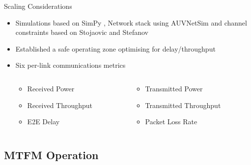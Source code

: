 \documentclass{beamer}
\begin{document}
\begin{frame}[label=scaling]{Scaling Considerations}
  \begin{itemize}
    \item Simulations based on SimPy \autocite{Mueller2003SimPy}, Network stack using AUVNetSim \autocite{Miquel2008} and channel constraints based on Stojaovic and Stefanov \autocite{Stojanovic2007,Stefanov2011}\hyperlink{tab:sysconstraints}{}
      \pause
    \item Established a safe operating zone optimising for delay/throughput  \hyperlink{eq:networkeffects}{}
    \item Six per-link communications metrics
      \pause\begin{columns}
        \begin{column}{0.5\textwidth}
          \begin{itemize}
            \item Received Power
            \item Received Throughput
            \item E2E Delay
          \end{itemize}
        \end{column}
        \begin{column}{0.5\textwidth}
          \begin{itemize}
            \item Transmitted Power
            \item Transmitted Throughput
            \item Packet Loss Rate
          \end{itemize}
        \end{column}
      \end{columns}
  \end{itemize}

\end{frame}

\subsection{MTFM Operation}
\end{document}

